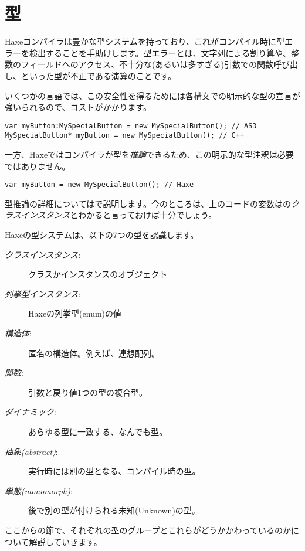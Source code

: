 \chapter{型}
\label{types}

Haxeコンパイラは豊かな型システムを持っており、これがコンパイル時に型エラーを検出することを手助けします。型エラーとは、文字列による割り算や、整数のフィールドへのアクセス、不十分な(あるいは多すぎる)引数での関数呼び出し、といった型が不正である演算のことです。

いくつかの言語では、この安全性を得るためには各構文での明示的な型の宣言が強いられるので、コストがかかります。

\begin{lstlisting}
var myButton:MySpecialButton = new MySpecialButton(); // AS3
MySpecialButton* myButton = new MySpecialButton(); // C++ 
\end{lstlisting}

一方、Haxeではコンパイラが型を\emph{推論}できるため、この明示的な型注釈は必要ではありません。

\begin{lstlisting}
var myButton = new MySpecialButton(); // Haxe
\end{lstlisting}

型推論の詳細についてはで説明します。今のところは、上のコードの変数はの\emph{クラスインスタンス}とわかると言っておけば十分でしょう。

Haxeの型システムは、以下の7つの型を認識します。

\begin{description}
 \item[\emph{クラスインスタンス}:] クラスかインスタンスのオブジェクト
 \item[\emph{列挙型インスタンス}:] Haxeの列挙型(enum)の値
 \item[\emph{構造体}:] 匿名の構造体。例えば、連想配列。
 \item[\emph{関数}:] 引数と戻り値1つの型の複合型。
 \item[\emph{ダイナミック}:] あらゆる型に一致する、なんでも型。
 \item[\emph{抽象(abstract)}:] 実行時には別の型となる、コンパイル時の型。
 \item[\emph{単態(monomorph)}:] 後で別の型が付けられる未知(Unknown)の型。
\end{description}

ここからの節で、それぞれの型のグループとこれらがどうかかわっているのかについて解説していきます。

